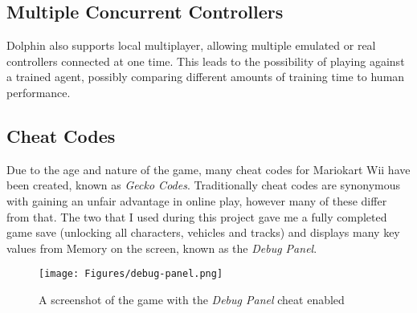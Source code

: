 \subsection{Multiple Concurrent Controllers}
Dolphin also supports local multiplayer, allowing multiple emulated or real controllers connected at one time. This leads to the possibility of playing against a trained agent, possibly comparing different amounts of training time to human performance.
\subsection{Cheat Codes}
Due to the age and nature of the game, many cheat codes for Mariokart Wii have been created, known as \textit{Gecko Codes}. Traditionally cheat codes are synonymous with gaining an unfair advantage in online play, however many of these differ from that. The two that I used during this project gave me a fully completed game save (unlocking all characters, vehicles and tracks) and displays many key values from Memory on the screen, known as the \textit{Debug Panel}\cite{GeckoCode}.
\begin{figure}[hbt]
    \centering
    \texttt{[image: Figures/debug-panel.png]}
    \caption{A screenshot of the game with the \textit{Debug Panel} cheat enabled}
    \label{fig:gecko-code}
\end{figure}
